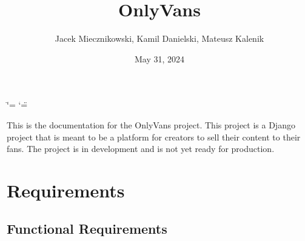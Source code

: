\documentclass[letterpaper,10pt,english]{sphinxmanual}
\title{OnlyVans}
\date{May 31, 2024}
\author{Jacek Miecznikowski, Kamil Danielski, Mateusz Kalenik}
\begin{document}
\ifdefined\shorthandoff
  \ifnum\catcode`\=\string=\active\shorthandoff{=}\fi
  \ifnum\catcode`\"=\active{}\fi
\fi

\pagestyle{empty}
\sphinxmaketitle
\pagestyle{plain}
\sphinxtableofcontents
\pagestyle{normal}
\label{\detokenize{index::doc}}


\sphinxAtStartPar
This is the documentation for the OnlyVans project. This project is a Django project that is meant to be a platform for creators to sell their content to their fans. The project is  in development and is not yet ready for production.

\sphinxstepscope


\chapter{Requirements}
\label{\detokenize{modules/requirements:requirements}}\label{\detokenize{modules/requirements::doc}}

\section{Functional Requirements}
\label{\detokenize{modules/requirements:functional-requirements}}
\end{document}

